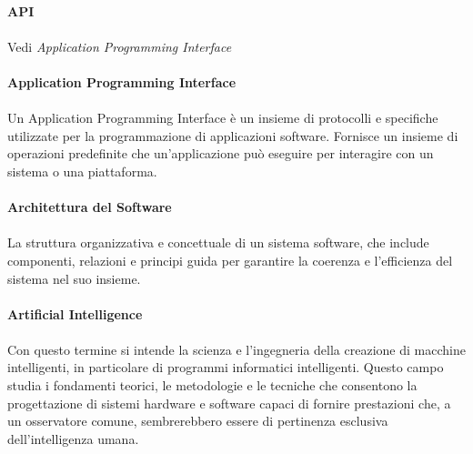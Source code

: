 \documentclass[10pt, a4paper]{article}
\begin{document}
\vspace{2em}
\paragraph{API}\noindent\hrulefill
\paragraph{}Vedi \textit{Application Programming Interface\pg}

\vspace{2em}
\paragraph{Application Programming Interface}\noindent\hrulefill
\paragraph{}Un Application Programming Interface è un insieme di protocolli e specifiche utilizzate per la programmazione di applicazioni software. Fornisce un insieme di operazioni predefinite che un'applicazione può eseguire per interagire con un sistema o una piattaforma.

\vspace{2em}
\paragraph{Architettura del Software}\noindent\hrulefill
\paragraph{}La struttura organizzativa e concettuale di un sistema software, che include componenti, relazioni e principi guida per garantire la coerenza e l'efficienza del sistema nel suo insieme.



\vspace{2em}
\paragraph{Artificial Intelligence}\noindent\hrulefill
\paragraph{}Con questo termine si intende la scienza e l’ingegneria della creazione di macchine intelligenti, in particolare di programmi informatici intelligenti. Questo campo studia i fondamenti teorici, le metodologie e le tecniche che consentono la progettazione di sistemi hardware e software capaci di fornire prestazioni che, a un osservatore comune, sembrerebbero essere di pertinenza esclusiva dell’intelligenza umana.
\end{document}
